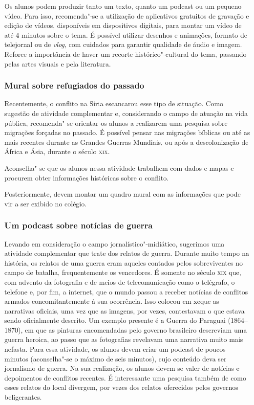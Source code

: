 \documentclass[12pt]{extarticle}
\begin{document}
Os alunos podem produzir tanto um texto, quanto um podcast ou um pequeno vídeo.
Para isso, recomenda"-se a utilização de aplicativos gratuitos de
gravação e edição de vídeos, disponíveis em dispositivos digitais,
para montar um vídeo de até 4 minutos sobre o tema. É possível
utilizar desenhos e animações, formato de telejornal ou de
\emph{vlog}, com cuidados para garantir qualidade de áudio e imagem.
Reforce a importância de haver um recorte histórico"-cultural do tema,
passando pelas artes visuais e pela literatura.


\subsubsection{Mural sobre refugiados do passado}

Recentemente, o conflito na Síria escancarou esse tipo de situação.
Como sugestão de atividade complementar e, considerando
o campo de atuação na vida pública, recomenda"-se orientar os 
alunos a realizarem uma pesquisa sobre
migrações forçadas no passado. É possível pensar nas migrações bíblicas ou 
até as mais recentes durante as Grandes Guerras Mundiais, ou 
após a descolonização de África e Ásia, durante o século \textsc{xix}.

Aconselha"-se que os alunos nessa atividade trabalhem com dados e mapas
e procurem obter informações históricas sobre o conflito.

Posteriormente, devem montar um quadro mural com as informações que
pode vir a ser exibido no colégio.

\subsubsection{Um podcast sobre notícias de guerra}

Levando em consideração o campo jornalístico"-midiático, sugerimos
uma atividade complementar que trate dos relatos de guerra.
Durante muito tempo na história, os relatos de uma guerra eram aqueles
contados pelos sobreviventes no campo de batalha, frequentemente os
vencedores. É somente no século \textsc{xix} que, com advento da fotografia e
de meios de telecomunicação como o telégrafo, o telefone e, por fim, a
internet, que o mundo passou a receber notícias de conflitos armados
concomitantemente à sua ocorrência. Isso colocou em xeque as
narrativas oficiais, uma vez que as imagens, por vezes, contestavam o
que estava sendo oficialmente descrito. Um exemplo presente é a Guerra
do Paraguai (1864--1870), em que as pinturas encomendadas pelo governo
brasileiro descreviam uma guerra heroica, ao passo que as fotografias
revelavam uma narrativa muito mais nefasta. Para essa atividade, os
alunos devem criar um podcast de poucos minutos (aconselha"-se o máximo
de seis minutos), cujo conteúdo deva ser jornalismo de guerra. Na sua
realização, os alunos devem se valer de notícias e depoimentos de
conflitos recentes. É interessante uma pesquisa também de como esses
relatos do local divergem, por vezes dos relatos oferecidos pelos
governos beligerantes.
\end{document}
